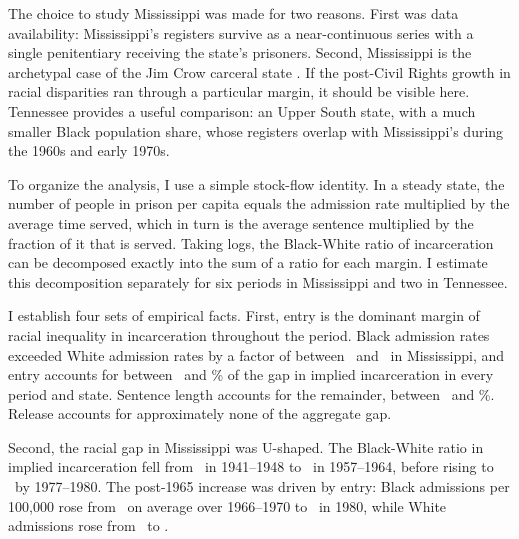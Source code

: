 \documentclass[12pt]{article}
\begin{document}
The choice to study Mississippi was made for two reasons.  First was data availability: Mississippi's registers survive as a near-continuous series with a single penitentiary receiving the state's prisoners.  Second, Mississippi is the archetypal case of the Jim Crow carceral state \citep{Oshinsky:1997up,Mickey:2015vh}.  If the post-Civil Rights growth in racial disparities ran through a particular margin, it should be visible here.  Tennessee provides a useful comparison: an Upper South state, with a much smaller Black population share, whose registers overlap with Mississippi's during the 1960s and early 1970s.

To organize the analysis, I use a simple stock-flow identity.  In a steady state, the number of people in prison per capita equals the admission rate multiplied by the average time served, which in turn is the average sentence multiplied by the fraction of it that is served.  Taking logs, the Black-White ratio of incarceration can be decomposed exactly into the sum of a ratio for each margin.  I estimate this decomposition separately for six periods in Mississippi and two in Tennessee.

I establish four sets of empirical facts.  First, entry is the dominant margin of racial inequality in incarceration throughout the period.  Black admission rates exceeded White admission rates by a factor of between \unskip~and \unskip~in Mississippi, and entry accounts for between \unskip~and \unskip\% of the gap in implied incarceration in every period and state.  Sentence length accounts for the remainder, between \unskip~and \unskip\%.  Release accounts for approximately none of the aggregate gap.

Second, the racial gap in Mississippi was U-shaped.  The Black-White ratio in implied incarceration fell from \unskip~in 1941--1948 to \unskip~in 1957--1964, before rising to \unskip~by 1977--1980.  The post-1965 increase was driven by entry: Black admissions per 100,000 rose from \unskip~on average over 1966--1970 to \unskip~in 1980, while White admissions rose from \unskip~to \unskip.
\end{document}
